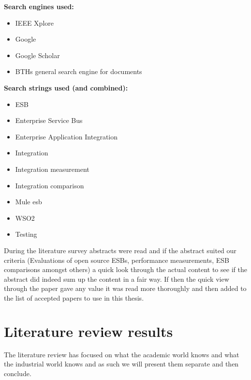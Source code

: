 \documentclass{llncs}
\begin{document}
{\bf Search engines used:}
\begin{itemize}
	\item IEEE Xplore
	\item Google
	\item Google Scholar
	\item BTHs general search engine for documents
\end{itemize}

{\bf Search strings used (and combined):}
\begin{itemize}
	\item ESB
	\item Enterprise Service Bus
	\item Enterprise Application Integration
	\item Integration
	\item Integration measurement
	\item Integration comparison
	\item Mule esb
	\item WSO2
	\item Testing
\end{itemize}

During the literature survey abstracts were read and if the abstract suited our criteria (Evaluations of open source ESBs, performance measurements, ESB comparisons amongst others) a quick look through the actual content to see if the abstract did indeed sum up the content in a fair way. If then the quick view through the paper gave any value it was read more thoroughly and then added to the list of accepted papers to use in this thesis.





\label{sec:method}
\section{Literature review results}
\label{sec:litrev}

The literature review has focused on what the academic world knows and what the industrial world knows and as such we will present them separate and then conclude.

\end{document}
